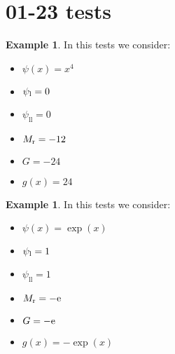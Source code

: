 \documentclass[11pt,a4paper]{article}
\theoremstyle{plain}
\theoremstyle{definition}
\newtheorem{exmp}[thm]{Example} %
\begin{document}
%


\section{01-23 tests}

\begin{exmp}
\label{Example:PRO:bending:01_23_glob3}
In this tests we consider:
\begin{itemize}
\item $\psi(x)=x^4$
\item $\psi_\text l=0$
\item $\psi_\text{ll}=0$
\item $M_\text r=-12$
\item $G=-24$
\item $g(x)=24$
\end{itemize}
\end{exmp}

%
%
%
%
\pagebreak

\begin{exmp}
\label{Example:PRO:bending:01_23_glob1}
In this tests we consider:
\begin{itemize}
\item $\psi(x)=\exp(x)$
\item $\psi_\text l=1$
\item $\psi_\text{ll}=1$
\item $M_\text r=-\text e$
\item $G=-\text e$
\item $g(x)=-\exp(x)$
\end{itemize}
\end{exmp}

\end{document}
